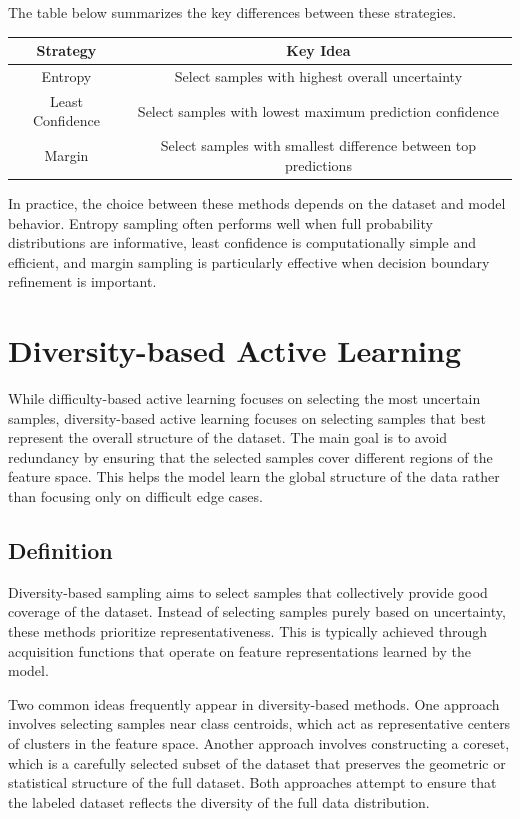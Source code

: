 \documentclass{article}
\begin{document}
The table below summarizes the key differences between these strategies.

\begin{center}
\begin{tabular}{|c|c|}
\hline
\textbf{Strategy} & \textbf{Key Idea} \\
\hline
Entropy & Select samples with highest overall uncertainty \\
Least Confidence & Select samples with lowest maximum prediction confidence \\
Margin & Select samples with smallest difference between top predictions \\
\hline
\end{tabular}
\end{center}

In practice, the choice between these methods depends on the dataset and model behavior. Entropy sampling often performs well when full probability distributions are informative, least confidence is computationally simple and efficient, and margin sampling is particularly effective when decision boundary refinement is important.

\section{Diversity-based Active Learning}

While difficulty-based active learning focuses on selecting the most uncertain samples, diversity-based active learning focuses on selecting samples that best represent the overall structure of the dataset. The main goal is to avoid redundancy by ensuring that the selected samples cover different regions of the feature space. This helps the model learn the global structure of the data rather than focusing only on difficult edge cases.

\subsection{Definition}

Diversity-based sampling aims to select samples that collectively provide good coverage of the dataset. Instead of selecting samples purely based on uncertainty, these methods prioritize representativeness. This is typically achieved through acquisition functions that operate on feature representations learned by the model.

Two common ideas frequently appear in diversity-based methods. One approach involves selecting samples near class centroids, which act as representative centers of clusters in the feature space. Another approach involves constructing a coreset, which is a carefully selected subset of the dataset that preserves the geometric or statistical structure of the full dataset. Both approaches attempt to ensure that the labeled dataset reflects the diversity of the full data distribution.
\end{document}
